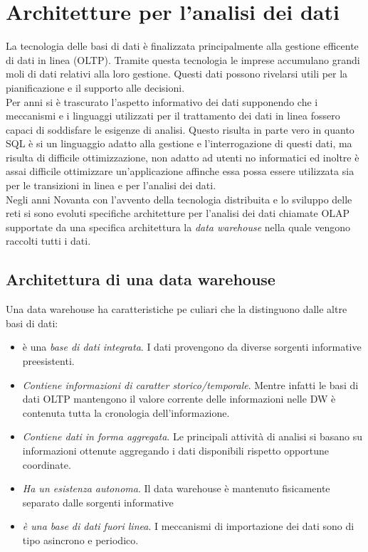 \label{capitolo3}
\section{Architetture per l'analisi dei dati}
La tecnologia delle basi di dati è finalizzata principalmente alla gestione efficente di dati in linea (OLTP). Tramite questa tecnologia le imprese accumulano grandi moli di dati relativi alla loro gestione. Questi dati possono rivelarsi utili per la pianificazione e il supporto alle decisioni.\\
Per anni si è trascurato l'aspetto informativo dei dati supponendo che i meccanismi e i linguaggi utilizzati per il trattamento dei dati in linea fossero capaci di soddisfare le esigenze di analisi. Questo risulta in parte vero in quanto SQL è si un linguaggio adatto alla gestione e l'interrogazione di questi dati, ma risulta di difficile ottimizzazione, non adatto ad utenti no informatici ed inoltre è assai difficile ottimizzare un'applicazione affinche essa possa essere utilizzata sia per le transizioni in linea e per l'analisi dei dati.\\
Negli anni Novanta con l'avvento della tecnologia distribuita e lo sviluppo delle reti si sono evoluti specifiche architetture per l'analisi dei dati chiamate OLAP supportate da una specifica architettura la \emph{data warehouse} nella quale vengono raccolti tutti i dati.
\subsection{Architettura di una data warehouse}
Una data warehouse ha caratteristiche pe
culiari che la distinguono dalle altre basi di dati:
\begin{itemize}
\item è una \emph{base di dati integrata}. I dati provengono da diverse sorgenti informative preesistenti.
\item \emph{Contiene informazioni di caratter storico/temporale}. Mentre infatti le basi di dati OLTP mantengono il valore corrente delle informazioni nelle DW è contenuta tutta la cronologia dell'informazione.
\item \emph{Contiene dati in forma aggregata}. Le principali attività di analisi si basano su informazioni ottenute aggregando i dati disponibili rispetto opportune coordinate.
\item \emph{Ha un esistenza autonoma}. Il data warehouse è mantenuto fisicamente separato dalle sorgenti informative
\item \emph{è una base di dati fuori linea}. I meccanismi di importazione dei dati sono di tipo asincrono e periodico.
\end{itemize}

